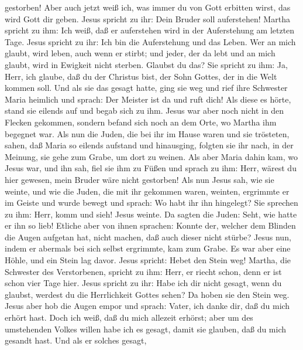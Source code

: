 gestorben!  Aber auch jetzt weiß ich, was immer du von
Gott erbitten wirst, das wird Gott dir geben.  Jesus
spricht zu ihr: Dein Bruder soll auferstehen!  Martha
spricht zu ihm: Ich weiß, daß er auferstehen wird in der Auferstehung am
letzten Tage.  Jesus spricht zu ihr: Ich bin die
Auferstehung und das Leben. Wer an mich glaubt, wird leben, auch wenn er
stirbt;  und jeder, der da lebt und an mich glaubt, wird
in Ewigkeit nicht sterben. Glaubst du das?  Sie spricht
zu ihm: Ja, Herr, ich glaube, daß du der Christus bist, der Sohn Gottes,
der in die Welt kommen soll.  Und als sie das gesagt
hatte, ging sie weg und rief ihre Schwester Maria heimlich und sprach:
Der Meister ist da und ruft dich!  Als diese es hörte,
stand sie eilends auf und begab sich zu ihm.  Jesus war
aber noch nicht in den Flecken gekommen, sondern befand sich noch an dem
Orte, wo Martha ihm begegnet war.  Als nun die Juden, die
bei ihr im Hause waren und sie trösteten, sahen, daß Maria so eilends
aufstand und hinausging, folgten sie ihr nach, in der Meinung, sie gehe
zum Grabe, um dort zu weinen.  Als aber Maria dahin kam,
wo Jesus war, und ihn sah, fiel sie ihm zu Füßen und sprach zu ihm:
Herr, wärest du hier gewesen, mein Bruder wäre nicht gestorben!
 Als nun Jesus sah, wie sie weinte, und wie die Juden,
die mit ihr gekommen waren, weinten, ergrimmte er im Geiste und wurde
bewegt  und sprach: Wo habt ihr ihn hingelegt? Sie
sprechen zu ihm: Herr, komm und sieh!  Jesus weinte.
 Da sagten die Juden: Seht, wie hatte er ihn so lieb!
Etliche aber von ihnen sprachen:  Konnte der, welcher dem
Blinden die Augen aufgetan hat, nicht machen, daß auch dieser nicht
stürbe?  Jesus nun, indem er abermals bei sich selbst
ergrimmte, kam zum Grabe. Es war aber eine Höhle, und ein Stein lag
davor.  Jesus spricht: Hebet den Stein weg! Martha, die
Schwester des Verstorbenen, spricht zu ihm: Herr, er riecht schon, denn
er ist schon vier Tage hier.  Jesus spricht zu ihr: Habe
ich dir nicht gesagt, wenn du glaubst, werdest du die Herrlichkeit
Gottes sehen?  Da hoben sie den Stein weg. Jesus aber hob
die Augen empor und sprach: Vater, ich danke dir, daß du mich erhört
hast.  Doch ich weiß, daß du mich allezeit erhörst; aber
um des umstehenden Volkes willen habe ich es gesagt, damit sie glauben,
daß du mich gesandt hast.  Und als er solches gesagt,
